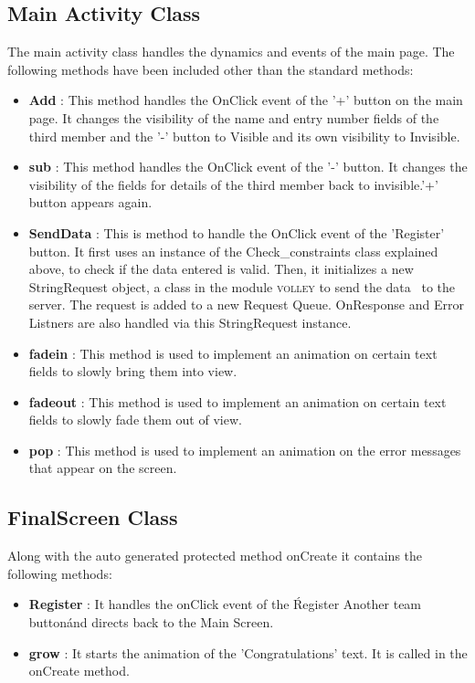 \documentclass{article}
\begin{document}
\subsection{Main Activity Class}
\par\noindent The main activity class handles the dynamics and events of the main page. The following methods have been included other than the standard methods:
\begin{itemize}
\item \textbf{Add} : This method handles the OnClick event of the '+' button on the main page. It changes the visibility of the name and entry number fields of the third member and the '-' button to Visible and its own visibility to Invisible.
\item \textbf{sub} : This method handles the OnClick event of the '-' button. It changes the visibility of the fields for details of the third member back to invisible.'+' button appears again.
\item \textbf{SendData} : This is method to handle the OnClick event of the 'Register' button. It first uses an instance of the Check\_constraints class explained above, to check if the data entered is valid. Then, it initializes a new StringRequest object, a class in the module \textsc{volley} to send the data~\cite{volley_post_request} to the server. The request is added to a new Request Queue.
OnResponse and Error Listners are also handled via this StringRequest instance.
\item \textbf{fadein} : This method is used to implement an animation on certain text fields to slowly bring them into view.
\item \textbf{fadeout} : This method is used to implement an animation on certain text fields to slowly fade them out of view.
\item \textbf{pop} : This method is used to implement an animation on the error messages that appear on the screen.
\end{itemize}

\subsection{FinalScreen Class}
\par\noindent Along with the auto generated protected method onCreate it contains the following methods:
\begin{itemize}
\item\textbf{Register} : It handles the onClick event of the \'Register Another team button\' and directs back to the Main Screen.
\item\textbf{grow} : It starts the animation of the 'Congratulations' text. It is called in the onCreate method.
\end{itemize}
\end{document}
